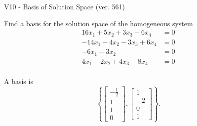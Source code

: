 \begin{exercise}
  \begin{exerciseTitle}V10 - Basis of Solution Space (ver. 561)\end{exerciseTitle}
  \begin{exerciseStatement}
    Find a basis for the solution space of the homogeneous system 
\begin{align*}
 16 x_ 1 + 5 x_ 2 + 3 x_ 3 -6 x_ 4 &= 0  \\ 
  -14 x_ 1 -4 x_ 2 -3 x_ 3 + 6 x_ 4 &= 0  \\ 
  -6 x_ 1 -3 x_ 2 &= 0  \\ 
  4 x_ 1 -2 x_ 2 + 4 x_ 3 -8 x_ 4 &= 0  \\ 
 \end{align*}


 
  \end{exerciseStatement}

  \begin{exerciseAnswer}
   A basis is   
\[\left\{\left[\begin{array}{c}
-\frac{1}{2} \\
1 \\
1 \\
0
\end{array}\right] , \left[\begin{array}{c}
1 \\
-2 \\
0 \\
1
\end{array}\right]\right\}.\]

  


  \end{exerciseAnswer}
\end{exercise}